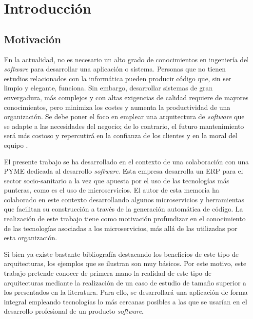 \documentclass[11pt,spanish,listoffigures]{tfgetsinf}
\begin{document}

\mainmatter


\chapter{Introducci\'on}

\section{Motivaci\'on}

En la actualidad, no es necesario un alto grado de conocimientos en ingeniería del \textit{software} para desarrollar una aplicación o sistema. Personas que no tienen estudios relacionados con la informática pueden producir código que, sin ser limpio y elegante, funciona. Sin embargo, desarrollar sistemas de gran envergadura, más complejos y con altas exigencias de calidad requiere de mayores conocimientos, pero minimiza los costes y aumenta la productividad de una organización. Se debe poner el foco en emplear una arquitectura de \textit{software} que se adapte a las necesidades del negocio; de lo contrario, el futuro mantenimiento será más costoso y repercutirá en la confianza de los clientes y en la moral del equipo \cite{Martin2017}.

El presente trabajo se ha desarrollado en el contexto de una colaboración con una PYME dedicada al desarrollo \textit{software}. Esta empresa desarrolla un ERP para el sector socio-sanitario a la vez que apuesta por el uso de las tecnologías más punteras, como es el uso de microservicios. El autor de esta memoria ha colaborado en este contexto desarrollando algunos microservicios y herramientas que facilitan su construcción a través de la generación automática de código. La realización de este trabajo tiene como motivación profundizar en el conocimiento de las tecnologías asociadas a los microservicios, más allá de las utilizadas por esta organización.

Si bien ya existe bastante bibliografía destacando los beneficios de este tipo de arquitecturas, los ejemplos que se ilustran son muy básicos. Por este motivo, este trabajo pretende conocer de primera mano la realidad de este tipo de arquitecturas mediante la realización de un caso de estudio de tamaño superior a los presentados en la literatura. Para ello, se desarrollará una aplicación de forma integral empleando tecnologías lo más cercanas posibles a las que se usarían en el desarrollo profesional de un producto \textit{software}.
\end{document}
